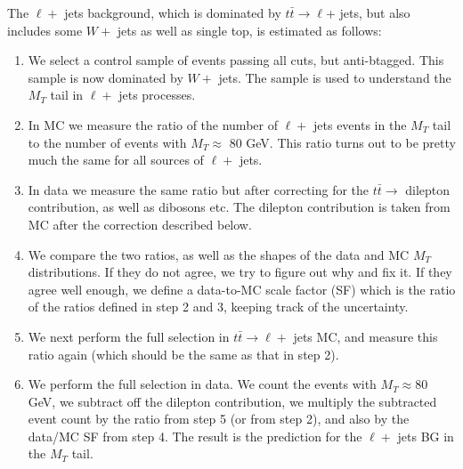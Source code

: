 The $\ell +$ jets background, which is dominated by 
$t\bar{t} \to \ell $+ jets, but also includes some $W +$ jets as well as single top,
is estimated as follows:
\begin{enumerate}
\item We select a control sample of events passing all cuts, but anti-btagged.  This
sample is now dominated by $W +$ jets.  The sample is used to understand the
$M_T$ tail in $\ell +$ jets processes. 
\item In MC we measure the ratio of the number of $\ell +$ jets events in the $M_T$ tail to
the number of events with $M_T \approx$ 80 GeV.  This ratio turns out to be pretty much the
same for all sources of $\ell +$ jets.
\item In data we measure the same ratio but after correcting for the $t\bar{t} \to$ dilepton
contribution, as well as dibosons etc.  The dilepton contribution is taken from MC after 
the correction described below.  
\item We compare the two ratios, as well as the shapes of the data and MC $M_T$ distributions. 
If they do not agree, we try to figure out why and fix it.  If they agree well enough, we define a 
data-to-MC scale factor (SF) which is the ratio of the  ratios defined in step 2 and 3, keeping track of the 
uncertainty.  
\item We next perform the full selection in $t\bar{t} \to \ell +$ jets MC, and measure this ratio
again (which should be the same as that in step 2).
\item We perform the full selection in data.  We count the events with $M_T \approx 80$ GeV, we
subtract off the dilepton contribution, we multiply the subtracted event count by the ratio from step 5 (or from 
step 2), and also by the data/MC SF from step 4.  The result is the prediction for the $\ell +$ jets BG in 
the $M_T$ tail.
\end{enumerate}

